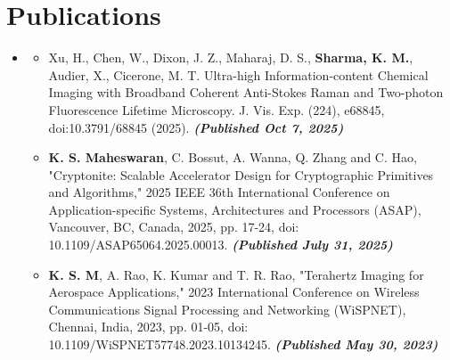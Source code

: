 \documentclass[a4paper,11pt]{article}
\makeatletter
\newcommand{\resumeItem}[1]{
  \item\small{
    {#1 \vspace{-2pt}}
  }
}
\newcommand{\resumeProjectHeading}[2]{
    \item
    \begin{tabular*}{1.001\textwidth}{l@{\extracolsep{\fill}}r}
      \small#1 & \textbf{\small #2}\\
    \end{tabular*}\vspace{-7pt}
}
\newcommand{\resumeSubHeadingListStart}{\begin{itemize}[leftmargin=0.0in, label={}]}
\newcommand{\resumeSubHeadingListEnd}{\end{itemize}}
\newcommand{\resumeItemListStart}{\begin{itemize}}
\newcommand{\resumeItemListEnd}{\end{itemize}\vspace{-5pt}}
\makeatother
\begin{document}

        

 \section{Publications}
\resumeSubHeadingListStart
    \item
    \small
    \resumeItemListStart
        \resumeItem{Xu, H., Chen, W., Dixon, J. Z., Maharaj, D. S., \textbf{Sharma, K. M.}, Audier, X., Cicerone, M. T. Ultra-high Information-content Chemical Imaging with Broadband Coherent Anti-Stokes Raman and Two-photon Fluorescence Lifetime Microscopy. J. Vis. Exp. (224), e68845, doi:10.3791/68845 (2025). \textbf{\textit{(Published Oct 7, 2025)}}}
        \resumeItem{\textbf{K. S. Maheswaran}, C. Bossut, A. Wanna, Q. Zhang and C. Hao, "Cryptonite: Scalable Accelerator Design for Cryptographic Primitives and Algorithms," 2025 IEEE 36th International Conference on Application-specific Systems, Architectures and Processors (ASAP), Vancouver, BC, Canada, 2025, pp. 17-24, doi: 10.1109/ASAP65064.2025.00013. \textbf{\textit{(Published July 31, 2025)}}}
        \resumeItem{\textbf{K. S. M}, A. Rao, K. Kumar and T. R. Rao, "Terahertz Imaging for Aerospace Applications," 2023 International Conference on Wireless Communications Signal Processing and Networking (WiSPNET), Chennai, India, 2023, pp. 01-05, doi: 10.1109/WiSPNET57748.2023.10134245. \textbf{\textit{(Published May 30, 2023)}}}
    \resumeItemListEnd
    \normalsize
\resumeSubHeadingListEnd
\end{document}
